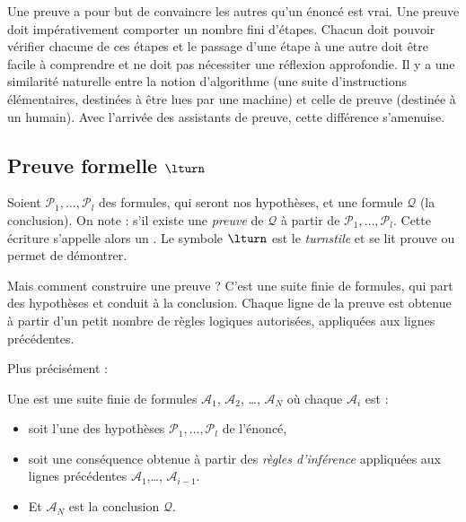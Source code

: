 \documentclass[11pt,class=report,crop=false]{standalone}
\begin{document}
Une preuve a pour but de convaincre les autres qu'un énoncé est vrai.
Une preuve doit impérativement comporter un nombre fini d'étapes.
Chacun doit pouvoir vérifier chacune de ces étapes et le passage d'une étape à une autre doit être facile à comprendre et ne doit pas nécessiter une réflexion approfondie.
Il y a une similarité naturelle entre la notion d'algorithme (une suite d'instructions élémentaires, destinées à être lues par une machine) et celle de preuve (destinée à un humain). Avec l'arrivée des assistants de preuve, cette différence s'amenuise.

\subsection{Preuve formelle $\lturn$}



Soient $\mathcal{P}_1,\ldots,\mathcal{P}_l$ des formules, qui seront nos hypothèses, et une formule $\mathcal{Q}$ (la conclusion).
On note :
s'il existe une \emph{preuve} de $\mathcal{Q}$ à partir de $\mathcal{P}_1, \ldots, \mathcal{P}_l$.
Cette écriture s'appelle alors un .
Le symbole $\lturn$ est le \emph{turnstile} et se lit \og{}prouve\fg{} ou \og{}permet de démontrer\fg{}.

Mais comment construire une preuve ? C'est une suite finie de formules, qui part des hypothèses et conduit à la conclusion.
Chaque ligne de la preuve est obtenue à partir d'un petit nombre de règles logiques autorisées, appliquées aux lignes précédentes.

Plus précisément :
\begin{definition}
	Une  est une suite finie de formules $\mathcal{A}_1$, $\mathcal{A}_2$, \ldots, $\mathcal{A}_N$
	où chaque $\mathcal{A}_i$ est :
	\begin{itemize}
		\item soit l'une des hypothèses $\mathcal{P}_1, \ldots, \mathcal{P}_l$ de l'énoncé,
		
		\item soit une conséquence obtenue à partir des \emph{règles d'inférence} appliquées aux lignes précédentes $\mathcal{A}_1$,\ldots, $\mathcal{A}_{i-1}$.
		
		\item Et $\mathcal{A}_N$ est la conclusion $\mathcal{Q}$.
	\end{itemize}	
\end{definition}
\end{document}
